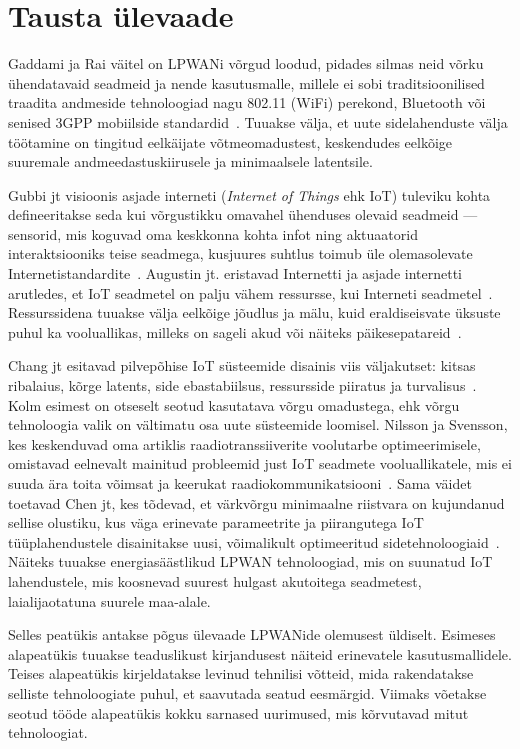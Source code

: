 \documentclass[12pt]{article}
\begin{document}
\newpage
\section{Tausta ülevaade}

Gaddami ja Rai väitel on LPWANi võrgud loodud, pidades silmas neid võrku ühendatavaid seadmeid ja nende kasutusmalle, millele ei sobi traditsioonilised traadita andmeside tehnoloogiad nagu 802.11 (WiFi) perekond, Bluetooth või senised 3GPP mobiilside standardid~\cite{gaddam2018comparative}.
Tuuakse välja, et uute sidelahenduste välja töötamine on tingitud eelkäijate võtmeomadustest, keskendudes eelkõige  suuremale andmeedastuskiirusele ja minimaalsele latentsile.

Gubbi jt visioonis asjade interneti (\textit{Internet of Things} ehk IoT) tuleviku kohta defineeritakse seda kui võrgustikku omavahel ühenduses olevaid seadmeid — sensorid, mis koguvad oma keskkonna kohta infot ning aktuaatorid interaktsiooniks teise seadmega, kusjuures suhtlus toimub üle olemasolevate Internetistandardite~\cite{gubbi2013internet}.
Augustin jt. eristavad Internetti ja asjade internetti arutledes, et IoT seadmetel on palju vähem ressursse, kui Interneti seadmetel~\cite{augustin2016study}.
Ressurssidena tuuakse välja eelkõige jõudlus ja mälu, kuid eraldiseisvate üksuste puhul ka vooluallikas, milleks on sageli akud või näiteks päikesepatareid~\cite{mabon2019smaller}.

Chang jt esitavad pilvepõhise IoT süsteemide disainis viis väljakutset: kitsas ribalaius, kõrge latents, side ebastabiilsus, ressursside piiratus ja turvalisus~\cite{chang2019internet}.
Kolm esimest on otseselt seotud kasutatava võrgu omadustega, ehk võrgu tehnoloogia valik on vältimatu osa uute süsteemide loomisel.
Nilsson ja Svensson, kes keskenduvad oma artiklis raadiotranssiiverite voolutarbe optimeerimisele, omistavad eelnevalt mainitud probleemid just IoT seadmete vooluallikatele, mis ei suuda ära toita võimsat ja keerukat raadiokommunikatsiooni~\cite{nilsson2014power}.
Sama väidet toetavad Chen jt, kes tõdevad, et värkvõrgu minimaalne riistvara on kujundanud sellise olustiku, kus väga erinevate parameetrite ja piirangutega IoT tüüplahendustele disainitakse uusi, võimalikult optimeeritud sidetehnoloogiaid~\cite{chen2018cognitive}.
Näiteks tuuakse energiasäästlikud LPWAN tehnoloogiad, mis on suunatud IoT lahendustele, mis koosnevad suurest hulgast akutoitega seadmetest, laialijaotatuna suurele maa-alale.

Selles peatükis antakse põgus ülevaade LPWANide olemusest üldiselt.
Esimeses alapeatükis tuuakse teaduslikust kirjandusest näiteid erinevatele kasutusmallidele.
Teises alapeatükis kirjeldatakse levinud tehnilisi võtteid, mida rakendatakse selliste tehnoloogiate puhul, et saavutada seatud eesmärgid.
Viimaks võetakse seotud tööde alapeatükis kokku sarnased uurimused, mis kõrvutavad mitut tehnoloogiat.
\end{document}
